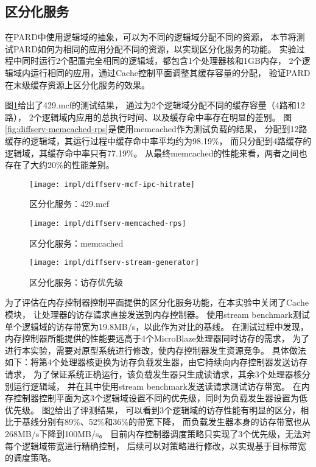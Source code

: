 \subsection{区分化服务}

在PARD中使用逻辑域的抽象，可以为不同的逻辑域分配不同的资源，
本节将测试PARD如何为相同的应用分配不同的资源，以实现区分化服务的功能。
实验过程中同时运行2个配置完全相同的逻辑域，都包含1个处理器核和1GB内存，
2个逻辑域内运行相同的应用，通过Cache控制平面调整其缓存容量的分配，
验证PARD在末级缓存资源上区分化服务的效果。

图\ref{fig:diffserv-mcf-ipc-hitrate}给出了429.mcf的测试结果，
通过为2个逻辑域分配不同的缓存容量（4路和12路），
2个逻辑域内应用的总执行时间、以及缓存命中率存在明显的差别。
图\ref{fig:diffserv-memcached-rps}是使用memcached作为测试负载的结果，
分配到12路缓存的逻辑域，其运行过程中缓存命中率平均约为98.19\%，
而只分配到4路缓存的逻辑域，其缓存命中率只有77.19\%。
从最终memcached的性能来看，两者之间也存在了大约20\%的性能差别。

\begin{figure}[tb]
  \centering
  \texttt{[image: impl/diffserv-mcf-ipc-hitrate]}
  \caption{区分化服务：429.mcf}
  \label{fig:diffserv-mcf-ipc-hitrate}
\end{figure}

\begin{figure}[tb]
\begin{minipage}[b]{0.48\textwidth}
  \centering
  \texttt{[image: impl/diffserv-memcached-rps]}
  \caption{区分化服务：memcached}
  \label{fig:diffserv-memcached-rps}
\end{minipage}\hfill
\begin{minipage}[b]{0.48\textwidth}
  \centering
  \texttt{[image: impl/diffserv-stream-generator]}
  \caption{区分化服务：访存优先级}
  \label{fig:diffserv-stream-generator}
\end{minipage}
\end{figure}

为了评估在内存控制器控制平面提供的区分化服务功能，在本实验中关闭了Cache模块，
让处理器的访存请求直接发送到内存控制器。
使用stream benchmark\cite{stream}测试单个逻辑域的访存带宽为19.8MB/s，以此作为对比的基线。
在测试过程中发现，内存控制器所能提供的性能要远高于4个MicroBlaze处理器同时访存的需求，
为了进行本实验，需要对原型系统进行修改，使内存控制器发生资源竞争。
具体做法如下：将第4个处理器核更换为访存负载发生器，由它持续向内存控制器发送访存请求，
为了保证系统正确运行，该负载发生器只生成读请求，其余3个处理器核分别运行逻辑域，
并在其中使用stream benchmark发送读请求测试访存带宽。
在内存控制器控制平面为这3个逻辑域设置不同的优先级，同时为负载发生器设置为低优先级。
图\ref{fig:diffserv-stream-generator}给出了评测结果，
可以看到3个逻辑域的访存性能有明显的区分，相比于基线分别有89\%、52\%和36\%的带宽下降，
而负载发生器本身的访存带宽也从268MB/s下降到100MB/s。
目前内存控制器调度策略只实现了3个优先级，无法对每个逻辑域带宽进行精确控制，
后续可以对策略进行修改，以实现基于目标带宽的调度策略。


